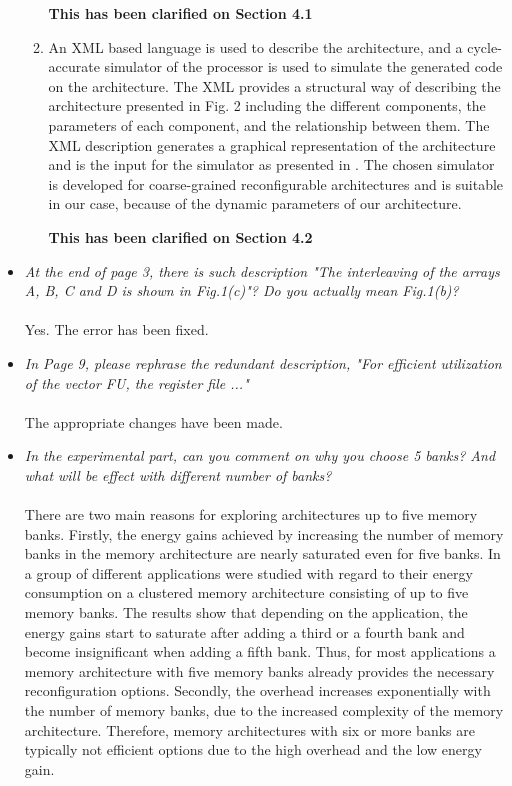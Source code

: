 \documentclass[12pt,a4paper,notitlepage]{article}
\begin{document}
\begin{itemize}
\begin{enumerate}
\textbf{This has been clarified on Section 4.1}

\item An XML based language is used to describe the architecture, and a cycle-accurate simulator of the processor is used to simulate the generated code on the architecture. The XML provides a structural way of describing the architecture presented in Fig. 2 including the different components, the parameters of each component, and the relationship between them. The XML description generates a graphical representation of the architecture and is the input for the simulator as presented in \cite{xml}. The chosen simulator is developed for coarse-grained reconfigurable architectures and is suitable in our case, because of the dynamic parameters of our architecture.

\textbf{This has been clarified on Section 4.2}

\end{enumerate}

\item \textit{At the end of page 3, there is such description "The interleaving of the arrays A, B, C and D is shown in Fig.1(c)"? Do you actually mean Fig.1(b)?}
\\
\\
Yes. The error has been fixed.

\item \textit{In Page 9, please rephrase the redundant description, "For efficient utilization of the vector FU, the register file ..."}
\\
\\
The appropriate changes have been made.

\item \textit{In the experimental part, can you comment on why you choose 5 banks? And what will be effect with different number of banks?}
\\
\\
There are two main reasons for exploring architectures up to five memory banks.
Firstly, the energy gains achieved by increasing the number of memory banks in the memory architecture are nearly saturated even for five banks.
In \cite{filippopoulos2013exploration} a group of different applications were studied with regard to their energy consumption on a clustered memory architecture consisting of up to five memory banks.
The results show that depending on the application, the energy gains start to saturate after adding a third or a fourth bank and become insignificant when adding a fifth bank.
Thus, for most applications a memory architecture with five memory banks already provides the necessary reconfiguration options.  
Secondly, the overhead increases exponentially with the number of memory banks, due to the increased complexity of the memory architecture. 
Therefore, memory architectures with six or more banks are typically not efficient options due to the high overhead and the low energy gain.


\end{itemize}
\end{document}
